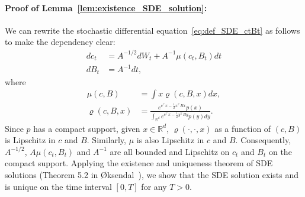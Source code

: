 \documentclass[11pt,twoside]{article}
\newcommand{\denb}{\varrho}
\newcommand{\co}{A}
\theoremstyle{named}
\theoremstyle{plain}
\newcommand{\usedim}{\ensuremath{d}}
\newcommand{\dims}{\usedim}
\newcommand{\real}{\ensuremath{\mathbb{R}}}
\newcommand{\parenth}[1]{\left( #1 \right)}
\newcommand{\tp}{^\top}
\begin{document}
\paragraph{Proof of Lemma~\ref{lem:existence_SDE_solution}:}
We can rewrite the stochastic differential equation~\eqref{eq:def_SDE_ctBt} as follows to make the dependency clear:
\begin{align*}
  dc_t &= \co^{-1/2} dW_t + \co^{-1} \mu\parenth{c_t, B_t} dt\\
  dB_t &= \co^{-1} dt,
\end{align*}
where
\begin{align*}
  \mu(c, B) &= \int x \denb(c, B, x) dx, \\
  \denb(c, B, x) &= \frac{e^{c\tp x - \frac{1}{2}x\tp B x} p(x)}{\int_{\real^\dims} e^{c \tp x - \frac{1}{2}y\tp B y} p(y) dy}.
\end{align*}
Since $p$ has a compact support, given $x \in \real^\dims$, $\denb(\cdot, \cdot, x)$ as a function of $(c, B)$ is Lipschitz in $c$ and $B$. Similarly, $\mu$ is also Lipschitz in $c$ and $B$. Consequently, $\co^{-1/2}$, $\co \mu(c_t, B_t)$ and $\co^{-1}$ are all bounded and Lipschitz on $c_t$ and $B_t$ on the compact support. Applying the existence and uniqueness theorem of SDE solutions (Theorem 5.2 in {\O}ksendal~\cite{oksendal2003stochastic}), we show that the SDE solution exists and is unique on the time interval $[0, T]$ for any $T > 0$.
\end{document}
